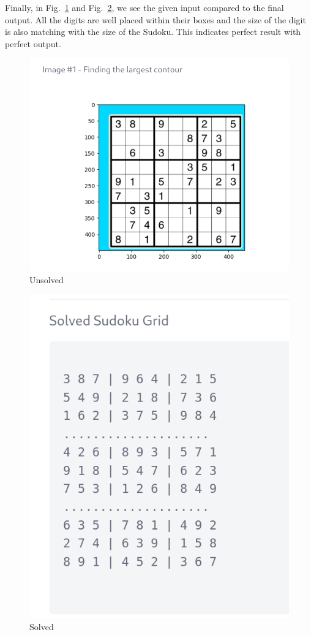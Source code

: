 \documentclass[conference]{IEEEtran}
\begin{document}
Finally, in Fig.~\ref{unsolved} and Fig.~\ref{solved}, we see the given input compared to the final output. All the digits are well placed within their boxes and the size of the digit is also matching with the size of the Sudoku. This indicates perfect
result with perfect output.

\begin{figure}[htbp]
\centerline{\includegraphics[scale=0.3]{assets/result-input/test1/4.png}}
\caption{Unsolved}
\label{unsolved}
\end{figure}

\begin{figure}[htbp]
\centerline{\includegraphics[scale=0.5]{assets/result-input/test1/7.png}}
\caption{Solved}
\label{solved}
\end{figure}
\end{document}
